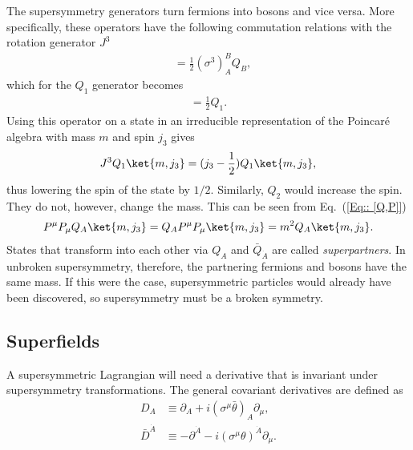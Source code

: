 \documentclass[twoside,english]{uiofysmaster}
\begin{document}
The supersymmetry generators turn fermions into bosons and vice versa. More specifically, these operators have the following commutation relations with the rotation generator $J^3$
\begin{align}
[ Q_A, J^3] &= \frac{1}{2} (\sigma^3)_A^BQ_B, 
\end{align}
which for the $Q_1$ generator becomes
\begin{align}
[Q_1, J^3] = \frac{1}{2} Q_1.
\end{align}
Using this operator on a state in an irreducible representation of the Poincar\'{e} algebra with mass $m$ and spin $j_3$ gives
\begin{align}
J^3 Q_1 \ket{m, j_3} = (j_3 - \frac{1}{2}) Q_1 \ket{m, j_3},
\end{align}
thus lowering the spin of the state by $1/2$. Similarly, $Q_2$ would increase the spin. They do not, however, change the mass. This can be seen from Eq.\ (\ref{Eq:: [Q,P]})
\begin{align}
P^{\mu} P_{\mu} Q_A \ket{m, j_3} = Q_A P^{\mu} P_{\mu} \ket{m, j_3} = m^2 Q_A \ket{m, j_3}.
\end{align}
States that transform into each other via $Q_A$ and $\bar{Q}_{\dot{A}}$ are called \textit{superpartners}. In unbroken supersymmetry, therefore, the partnering fermions and bosons have the same mass. If this were the case, supersymmetric particles would already have been discovered, so supersymmetry must be a broken symmetry.
\subsection{Superfields}

A supersymmetric Lagrangian will need a derivative that is invariant under supersymmetry transformations. The general covariant derivatives are defined as
\begin{align}
D_A & \equiv \partial_A + i (\sigma^{\mu} \bar{\theta})_A \partial_{\mu},\\
\bar{D}^{\dot{A}} & \equiv -\partial^{\dot{A}} - i (\sigma^{\mu} \theta)^{\dot{A}} \partial_{\mu}.
\end{align}
\end{document}
